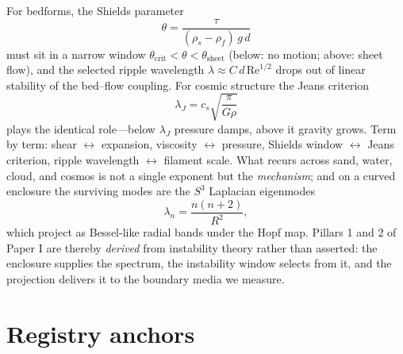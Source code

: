 \documentclass[11pt]{article}
\theoremstyle{remark}
\begin{document}
For bedforms, the Shields parameter
\begin{equation}
\theta = \frac{\tau}{(\rho_s - \rho_f)\, g\, d}
\end{equation}
must sit in a narrow window $\theta_{\mathrm{crit}} < \theta < \theta_{\mathrm{sheet}}$ (below: no motion; above: sheet flow), and the selected ripple wavelength $\lambda \approx C\, d\, \mathrm{Re}^{1/2}$ drops out of linear stability of the bed--flow coupling. For cosmic structure the Jeans criterion
\begin{equation}
\lambda_J = c_s \sqrt{\frac{\pi}{G\rho}}
\end{equation}
plays the identical role---below $\lambda_J$ pressure damps, above it gravity grows. Term by term: shear $\leftrightarrow$ expansion, viscosity $\leftrightarrow$ pressure, Shields window $\leftrightarrow$ Jeans criterion, ripple wavelength $\leftrightarrow$ filament scale. What recurs across sand, water, cloud, and cosmos is not a single exponent but the \emph{mechanism}; and on a curved enclosure the surviving modes are the $S^3$ Laplacian eigenmodes
\begin{equation}
\lambda_n = \frac{n(n+2)}{R^2},
\end{equation}
which project as Bessel-like radial bands under the Hopf map. Pillars 1 and 2 of Paper I are thereby \emph{derived} from instability theory rather than asserted: the enclosure supplies the spectrum, the instability window selects from it, and the projection delivers it to the boundary media we measure.

\section{Registry anchors}
\label{sec:registry}
\end{document}
